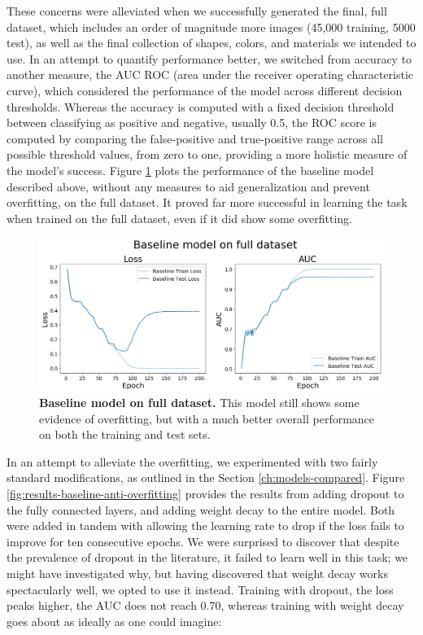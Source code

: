 These concerns were alleviated when we successfully generated the final, full dataset, which includes an order of magnitude more images (45,000 training, 5000 test), as well as the final collection of shapes, colors, and materials we intended to use. In an attempt to quantify performance better, we switched from accuracy to another measure, the AUC ROC (area under the receiver operating characteristic curve), which considered the performance of the model across different decision thresholds. Whereas the accuracy is computed with a fixed decision threshold between classifying as positive and negative, usually 0.5, the ROC score is computed by comparing the false-positive and true-positive range across all possible threshold values, from zero to one, providing a more holistic measure of the model’s success. Figure \ref{fig:results-baseline-full-dataset} plots the performance of the baseline model described above, without any measures to aid generalization and prevent overfitting, on the full dataset. It proved far more successful in learning the task when trained on the full dataset, even if it did show some overfitting. 

\begin{figure}[!htb]
\centering
\includegraphics[width=\linewidth]{ch-results/figures/baseline/full_dataset.png}
\caption[Baseline model on full dataset.]{{\bf Baseline model on full dataset.} This model still shows some evidence of overfitting, but with a much better overall performance on both the training and test sets.}
\label{fig:results-baseline-full-dataset}
\end{figure}

In an attempt to alleviate the overfitting, we experimented with two fairly standard modifications, as outlined in the Section \ref{ch:models-compared}. Figure \ref{fig:results-baseline-anti-overfitting} provides the results from adding dropout to the fully connected layers, and adding weight decay to the entire model. Both were added in tandem with allowing the learning rate to drop if the loss fails to improve for ten consecutive epochs. We were surprised to discover that despite the prevalence of dropout in the literature, it failed to learn well in this task; we might have investigated why, but having discovered that weight decay works spectacularly well, we opted to use it instead. Training with dropout, the loss peaks higher, the AUC does not reach 0.70, whereas training with weight decay goes about as ideally as one could imagine:

